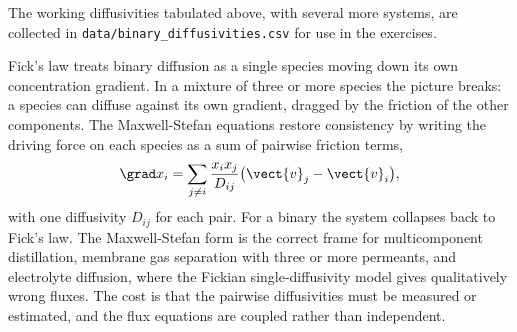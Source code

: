 

The working diffusivities tabulated above, with several more systems,
are collected in \texttt{data/binary\_diffusivities.csv} for use in
the exercises.

\begin{mastery}
Fick's law treats binary diffusion as a single species moving down its
own concentration gradient. In a mixture of three or more species the
picture breaks: a species can diffuse against its own gradient, dragged
by the friction of the other components. The Maxwell-Stefan equations
restore consistency by writing the driving force on each species as a
sum of pairwise friction terms,
\[
\grad x_i = \sum_{j\neq i} \frac{x_i x_j}{D_{ij}}
\big(\vect{v}_j - \vect{v}_i\big),
\]
with one diffusivity $D_{ij}$ for each pair. For a binary the system
collapses back to Fick's law. The Maxwell-Stefan form is the correct
frame for multicomponent distillation, membrane gas separation with
three or more permeants, and electrolyte diffusion, where the Fickian
single-diffusivity model gives qualitatively wrong fluxes. The cost is
that the pairwise diffusivities must be measured or estimated, and the
flux equations are coupled rather than independent.
\end{mastery}


